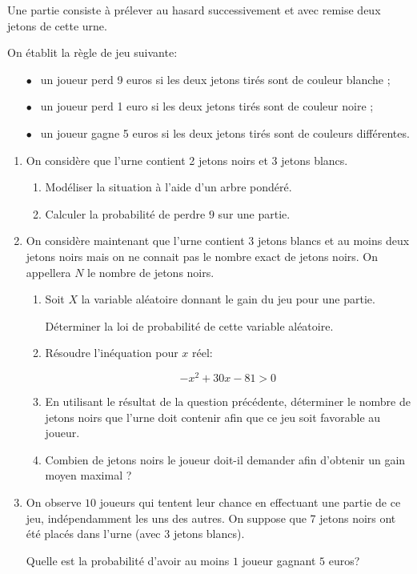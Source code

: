 \documentclass[11pt,a4paper,french]{article}
\newcommand{\euro}{\eurologo{}}
\begin{document}
Une partie consiste à prélever au hasard successivement et avec remise deux jetons de cette urne.

On établit la règle de jeu suivante:

\setlength\parindent{1cm}
\begin{itemize}
\item[$\bullet~~$] un joueur perd 9 euros si les deux jetons tirés sont de couleur blanche ;
\item[$\bullet~~$] un joueur perd 1 euro si les deux jetons tirés sont de couleur noire ;
\item[$\bullet~~$] un joueur gagne 5 euros si les deux jetons tirés sont de couleurs différentes.
\end{itemize}
\setlength\parindent{0cm}

\medskip

\begin{enumerate}
\item On considère que l'urne contient 2 jetons noirs et 3 jetons blancs.
	\begin{enumerate}
		\item Modéliser la situation à l'aide d'un arbre pondéré.
		\item Calculer la probabilité de perdre $9$ \euro{} sur une partie.
	\end{enumerate}	
\item On considère maintenant que l'urne contient 3 jetons blancs et au moins deux jetons noirs mais on ne connait pas le nombre exact de jetons noirs. On appellera $N$ le nombre de jetons noirs.
	\begin{enumerate}
		\item Soit $X$ la variable aléatoire donnant le gain du jeu pour une partie.
		
Déterminer la loi de probabilité de cette variable aléatoire.
		\item Résoudre l'inéquation pour $x$ réel:
		
\[-x^2  + 30x - 81 > 0\]

		\item En utilisant le résultat de la question précédente, déterminer le nombre de jetons noirs que l'urne doit contenir afin que ce jeu soit favorable au joueur.
		\item Combien de jetons noirs le joueur doit-il demander afin d'obtenir un gain moyen maximal ?
	\end{enumerate}
\item On observe $10$ joueurs qui tentent leur chance en effectuant une partie de ce jeu, indépendamment les uns des autres. On suppose que 7 jetons noirs ont été placés dans l'urne (avec 3 jetons blancs). 

Quelle est la probabilité d'avoir au moins $1$ joueur gagnant $5$ euros?
\end{enumerate}
\end{document}

